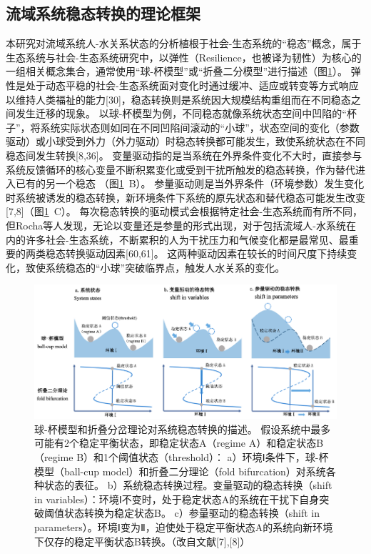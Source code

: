 \subsection{流域系统稳态转换的理论框架}

本研究对流域系统人-水关系状态的分析植根于社会-生态系统的“稳态”概念，属于生态系统与社会-生态系统研究中，以弹性（Resilience，也被译为韧性）为核心的一组相关概念集合，通常使用“球-杯模型”或“折叠二分模型”进行描述（图\ref{ch2:fig:regime_shift}）。
弹性是处于动态平稳的社会-生态系统面对变化时通过缓冲、适应或转变等方式响应以维持人类福祉的能力[30]，稳态转换则是系统因大规模结构重组而在不同稳态之间发生迁移的现象。
以球-杯模型为例，不同稳态就像系统状态空间中凹陷的“杯子”，将系统实际状态则如同在不同凹陷间滚动的“小球”，状态空间的变化（参数驱动）或小球受到外力（外力驱动）时稳态转换都可能发生，致使系统状态在不同稳态间发生转换[8,36]。
变量驱动指的是当系统在外界条件变化不大时，直接参与系统反馈循环的核心变量不断积累变化或受到干扰所触发的稳态转换，作为替代进入已有的另一个稳态 （图\ref{ch2:fig:regime_shift}~B）。
参量驱动则是当外界条件（环境参数）发生变化时系统被诱发的稳态转换，新环境条件下系统的原先状态和替代稳态可能发生改变[7,8]（图\ref{ch2:fig:regime_shift}~C）。
每次稳态转换的驱动模式会根据特定社会-生态系统而有所不同，但Rocha等人发现，无论以变量还是参量的形式出现，对于包括流域人-水系统在内的许多社会-生态系统，不断累积的人为干扰压力和气候变化都是最常见、最重要的两类稳态转换驱动因素[60,61]。
这两种驱动因素在较长的时间尺度下持续变化，致使系统稳态的“小球”突破临界点，触发人水关系的变化。

\begin{figure}[htb] %
    \centering
    \includegraphics[width=\textwidth]{img/ch2/ch2_regime_shift.png}
    \caption[球-杯模型和折叠分岔理论对系统稳态转换的描述]{球-杯模型和折叠分岔理论对系统稳态转换的描述。
    假设系统中最多可能有2个稳定平衡状态，即稳定状态A（regime A）和稳定状态B（regime B）和1个阈值状态（threshold）：
    a）环境Ⅰ条件下，球-杯模型（ball-cup model）和折叠二分理论（fold bifurcation）对系统各种状态的表征。
    b）系统稳态转换过程。变量驱动的稳态转换（shift in variables）：环境Ⅰ不变时，处于稳定状态A的系统在干扰下自身突破阈值状态转换为稳定状态B。
    c）参量驱动的稳态转换（shift in parameters）。环境Ⅰ变为Ⅱ，迫使处于稳定平衡状态A的系统向新环境下仅存的稳定平衡状态B转换。（改自文献[7],[8]）}\label{ch2:fig:regime_shift}
\end{figure}

